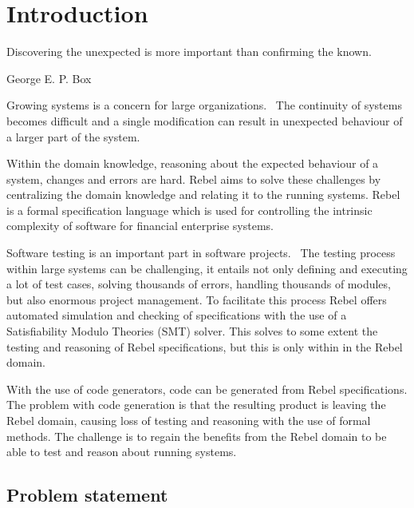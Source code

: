 \chapter{Introduction}

\epigraph{Discovering the unexpected is more important than confirming the
known.}{George E. P. Box}

Growing systems is a concern for large
organizations.~\cite[p.~1]{stoel_storm_vinju_bosman_2016} The continuity of
systems becomes difficult and a single modification can result in unexpected
behaviour of a larger part of the system.

Within the domain knowledge, reasoning about the expected behaviour of a system,
changes and errors are hard. Rebel aims to solve these challenges by centralizing the domain knowledge and relating
it to the running systems. Rebel is a formal specification language which is
used for controlling the intrinsic complexity of software for financial
enterprise systems.~\cite[p.~1]{stoel_storm_vinju_bosman_2016}

Software testing is an important part in software projects.~\cite[p.~4]{myers2011art} The testing
process within large systems can be challenging, it entails not only defining
and executing a lot of test cases, solving thousands of errors, handling
thousands of modules, but also enormous project management. To facilitate this
process Rebel offers automated simulation and checking of specifications with
the use of a Satisfiability Modulo Theories (SMT) solver. This solves to some
extent the testing and reasoning of Rebel specifications, but this is only
within in the Rebel domain.

With the use of code generators, code can be
generated from Rebel specifications. The problem with code generation is that the resulting
product is leaving the Rebel domain, causing loss of testing and reasoning with
the use of formal methods. The challenge is to regain the benefits from the
Rebel domain to be able to test and reason about running systems.

\section{Problem statement}\label{sec:problem-statement}


